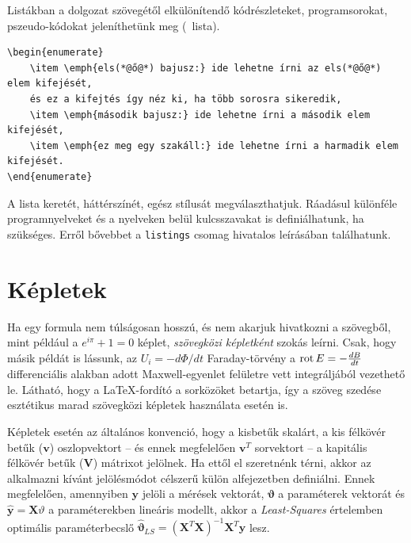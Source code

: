 Listákban a dolgozat szövegétől elkülönítendő kódrészleteket, programsorokat, pszeudo-kódokat jeleníthetünk meg (~lista).
\begin{lstlisting}[caption=A fenti számozott felsorolás \LaTeX-forráskódja,label=listing:Example]
\begin{enumerate}
	\item \emph{els(*@ő@*) bajusz:} ide lehetne írni az els(*@ő@*) elem kifejését,
	és ez a kifejtés így néz ki, ha több sorosra sikeredik,
	\item \emph{második bajusz:} ide lehetne írni a második elem kifejését,
	\item \emph{ez meg egy szakáll:} ide lehetne írni a harmadik elem kifejését.
\end{enumerate}
\end{lstlisting}
A lista keretét, háttérszínét, egész stílusát megválaszthatjuk. Ráadásul különféle programnyelveket és a nyelveken belül kulcsszavakat is definiálhatunk, ha szükséges. Erről bővebbet a \verb+listings+ csomag hivatalos leírásában találhatunk.

\section{Képletek}
Ha egy formula nem túlságosan hosszú, és nem akarjuk hivatkozni a szövegből, mint például a $e^{i\pi}+1=0$ képlet, \emph{szövegközi képletként} szokás leírni. Csak, hogy másik példát is lássunk, az $U_i=-d\Phi/dt$ Faraday-törvény a $\operatorname{rot} E=-\frac{dB}{dt}$ differenciális alakban adott Maxwell-egyenlet felületre vett integráljából vezethető le. Látható, hogy a \LaTeX-fordító a sorközöket betartja, így a szöveg szedése esztétikus marad szövegközi képletek használata esetén is.

Képletek esetén az általános konvenció, hogy a kisbetűk skalárt, a kis félkövér betűk ($\mathbf{v}$) oszlopvektort -- és ennek megfelelően $\mathbf{v}^T$ sorvektort -- a kapitális félkövér betűk ($\mathbf{V}$) mátrixot jelölnek. Ha ettől el szeretnénk térni, akkor az alkalmazni kívánt jelölésmódot célszerű külön alfejezetben definiálni. Ennek megfelelően, amennyiben $\mathbf{y}$ jelöli a mérések vektorát, $\mathbf{\vartheta}$ a paraméterek vektorát és $\hat{\mathbf{y}}=\mathbf{X}\vartheta$ a paraméterekben lineáris modellt, akkor a \emph{Least-Squares} értelemben optimális paraméterbecslő $\hat{\mathbf{\vartheta}}_{LS}=(\mathbf{X}^T\mathbf{X})^{-1}\mathbf{X}^T\mathbf{y}$ lesz.

